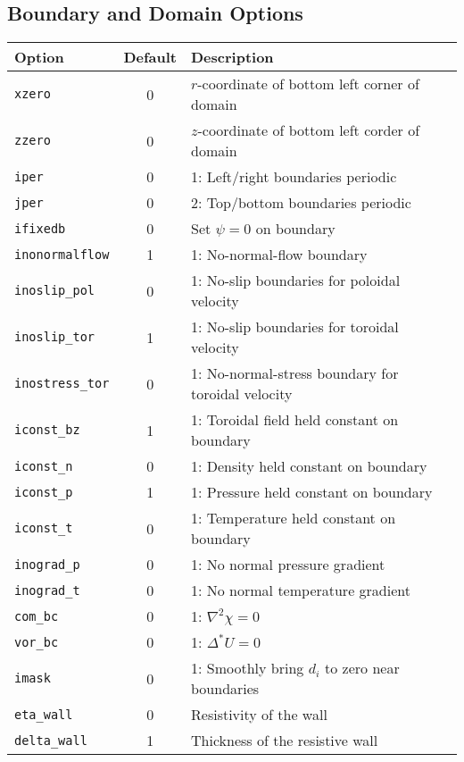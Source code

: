 \subsection{Boundary and Domain Options}

\begin{tabular}{lcp{2.5in}}
  \textbf{Option} & \textbf{Default} & \textbf{Description}\\
  \hline
  \texttt{xzero}  & 0 & $r$-coordinate of bottom left corner of domain\\
  \texttt{zzero}  & 0 & $z$-coordinate of bottom left corder of domain\\
  \texttt{iper}   & 0 & 1: Left/right boundaries periodic\\
  \texttt{jper}   & 0 & 2: Top/bottom boundaries periodic\\
  \hline
  \texttt{ifixedb} & 0 & Set $\psi=0$ on boundary\\
  \texttt{inonormalflow}& 1 & 1: No-normal-flow boundary\\
  \texttt{inoslip\_pol} & 0 & 1: No-slip boundaries for poloidal velocity\\
  \texttt{inoslip\_tor} & 1 & 1: No-slip boundaries for toroidal velocity\\
  \texttt{inostress\_tor}&0 & 1: No-normal-stress boundary for toroidal 
                                 velocity\\
  \texttt{iconst\_bz} & 1 & 1: Toroidal field held constant on boundary\\
  \texttt{iconst\_n}  & 0 & 1: Density held constant on boundary\\
  \texttt{iconst\_p}  & 1 & 1: Pressure held constant on boundary\\
  \texttt{iconst\_t}  & 0 & 1: Temperature held constant on boundary\\
  \texttt{inograd\_p} & 0 & 1: No normal pressure gradient\\
  \texttt{inograd\_t} & 0 & 1: No normal temperature gradient\\
  \texttt{com\_bc}& 0 & 1: $\nabla^2 \chi = 0$\\
  \texttt{vor\_bc}& 0 & 1: $\Delta^* U = 0$\\
  \texttt{imask}  & 0 & 1: Smoothly bring $d_i$ to zero near
    boundaries\\
  \hline
  \texttt{eta\_wall}   & 0 & Resistivity of the wall\\
  \texttt{delta\_wall} & 1 & Thickness of the resistive wall
\end{tabular}



